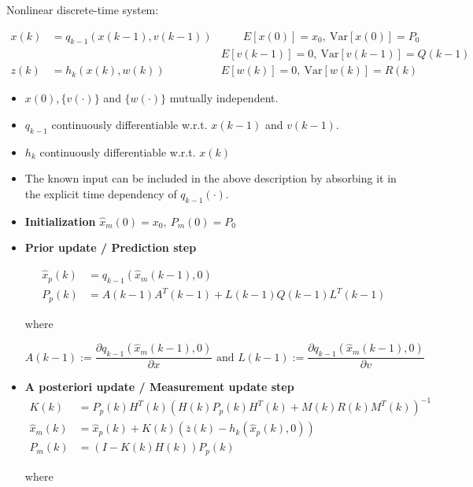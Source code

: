 \documentclass[10pt,a4paper]{scrartcl}
\begin{document}
\begin{multicols*}{2}
Nonlinear discrete-time system:

\begin{align*}
x(k)&=q_{k-1}(x(k-1),v(k-1))&\qquad E[x(0)]=x_0,\ \text{Var}[x(0)]=P_0\\
&&E[v(k-1)]=0,\ \text{Var}[v(k-1)]=Q(k-1)\\
z(k)&=h_k(x(k),w(k))&E[w(k)]=0,\ \text{Var}[w(k)]=R(k)
\end{align*}

\begin{itemize}
\item $x(0), \{v(\cdot)\}$ and $\{w(\cdot)\}$ mutually independent.
\item $q_{k-1}$ continuously differentiable w.r.t. $x(k-1)$ and $v(k-1)$.
\item $h_k$ continuously differentiable w.r.t. $x(k)$
\item The known input can be included in the above description by absorbing it in the explicit time dependency of $q_{k-1}(\cdot)$.
\end{itemize}

\begin{itemize}
\item \textbf{Initialization} $\hat{x}_m(0)=x_0,\ P_m(0)=P_0$
\item \textbf{Prior update / Prediction step}

\begin{align*}
\hat{x}_p(k)&=q_{k-1}(\hat{x}_m(k-1),0)\\
P_p(k)&=A(k-1)A^T(k-1)+L(k-1)Q(k-1)L^T(k-1)
\end{align*}

where 

\begin{equation*}
A(k-1):=\frac{\partial q_{k-1}(\hat{x}_m(k-1),0)}{\partial x}\text{ and }L(k-1):=\frac{\partial q_{k-1}(\hat{x}_m(k-1),0)}{\partial v}
\end{equation*}
\item \textbf{A posteriori update / Measurement update step}
\begin{align*}
K(k)&=P_p(k)H^T(k)(H(k)P_p(k)H^T(k)+M(k)R(k)M^T(k))^{-1}\\
\hat{x}_m(k)&=\hat{x}_p(k)+K(k)(\bar{z}(k)-h_k(\hat{x}_p(k),0))\\
P_m(k)&=(I-K(k)H(k))P_p(k)
\end{align*}

where


\end{itemize}
\end{multicols*}
\end{document}
